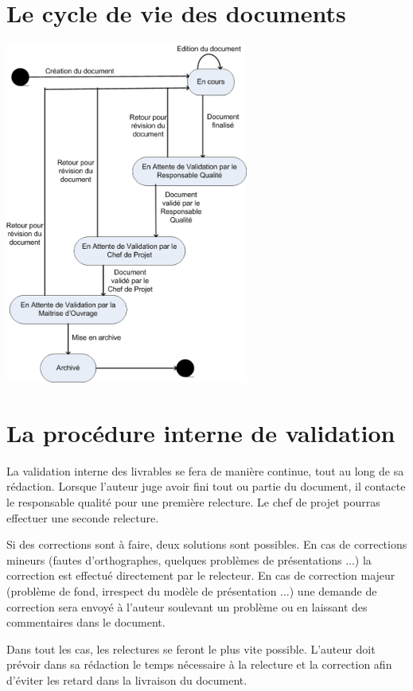 \section{Le cycle de vie des documents}

\begin{center}
\includegraphics[width=0.6\textwidth]{img/cycleVie.png}
\end{center}

\section{La procédure interne de validation}

La validation interne des livrables se fera de manière continue, tout au long de sa rédaction.
Lorsque l’auteur juge avoir fini tout ou partie du document, il contacte le responsable qualité pour une première relecture. Le chef de projet pourras effectuer une seconde relecture.

Si des corrections sont à faire, deux solutions sont possibles.
En cas de corrections mineurs (fautes d’orthographes, quelques problèmes de présentations ...) la correction est effectué directement par le relecteur.
En cas de correction majeur (problème de fond, irrespect du modèle de présentation ...) une demande de correction sera envoyé à l’auteur soulevant un problème ou en laissant des commentaires dans le document.

Dans tout les cas, les relectures se feront le plus vite possible.
L’auteur doit prévoir dans sa rédaction le temps nécessaire à la relecture et la correction afin d’éviter les retard dans la livraison du document.

